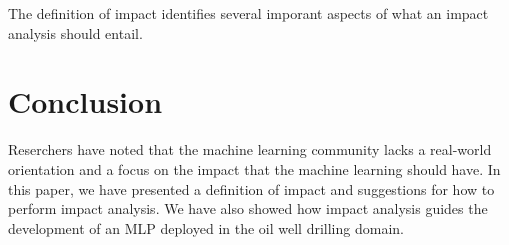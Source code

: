 \documentclass{article}
\begin{document}
The definition of impact identifies several imporant aspects of what an impact analysis should entail.






\section{Conclusion}
\label{sec:conclusion}
Reserchers have noted that the machine learning community lacks a real-world orientation and a focus on the impact that the machine learning should have.
In this paper, we have presented a definition of impact and suggestions for how to perform impact analysis.
We have also showed how impact analysis guides the development of an MLP deployed in the oil well drilling domain.



%
%
%
%
%
%

%
%
%
%
%
%
%
%
%
%
%
%
%
%
%
%



\end{document}

